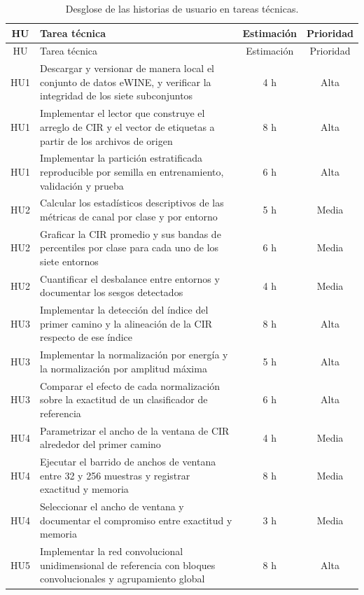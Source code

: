 \documentclass[
11pt, %
]{charter}
\begin{document}
\begin{longtable}{@{}|c|p{8.0cm}|c|c|@{}}
\caption{Desglose de las historias de usuario en tareas técnicas.}
\label{tab:tareas} \\
\hline
\rowcolor[HTML]{C0C0C0}
HU & Tarea técnica & Estimación & Prioridad \\ \hline
\endfirsthead
\hline
\rowcolor[HTML]{C0C0C0}
HU & Tarea técnica & Estimación & Prioridad \\ \hline
\endhead
HU1 & Descargar y versionar de manera local el conjunto de datos eWINE, y verificar la integridad de los siete subconjuntos & 4 h & Alta \\ \hline
HU1 & Implementar el lector que construye el arreglo de CIR y el vector de etiquetas a partir de los archivos de origen & 8 h & Alta \\ \hline
HU1 & Implementar la partición estratificada reproducible por semilla en entrenamiento, validación y prueba & 6 h & Alta \\ \hline
HU2 & Calcular los estadísticos descriptivos de las métricas de canal por clase y por entorno & 5 h & Media \\ \hline
HU2 & Graficar la CIR promedio y sus bandas de percentiles por clase para cada uno de los siete entornos & 6 h & Media \\ \hline
HU2 & Cuantificar el desbalance entre entornos y documentar los sesgos detectados & 4 h & Media \\ \hline
HU3 & Implementar la detección del índice del primer camino y la alineación de la CIR respecto de ese índice & 8 h & Alta \\ \hline
HU3 & Implementar la normalización por energía y la normalización por amplitud máxima & 5 h & Alta \\ \hline
HU3 & Comparar el efecto de cada normalización sobre la exactitud de un clasificador de referencia & 6 h & Alta \\ \hline
HU4 & Parametrizar el ancho de la ventana de CIR alrededor del primer camino & 4 h & Media \\ \hline
HU4 & Ejecutar el barrido de anchos de ventana entre 32 y 256 muestras y registrar exactitud y memoria & 8 h & Media \\ \hline
HU4 & Seleccionar el ancho de ventana y documentar el compromiso entre exactitud y memoria & 3 h & Media \\ \hline
HU5 & Implementar la red convolucional unidimensional de referencia con bloques convolucionales y agrupamiento global & 8 h & Alta \\ \hline

\end{longtable}
\end{document}
